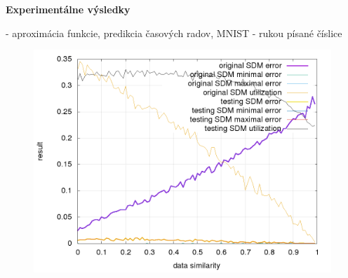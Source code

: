 \documentclass[xcolor=dvipsnames]{beamer}
\begin{document}
\begin{frame}{\bf Experimentálne výsledky}

- aproximácia funkcie, predikcia časových radov, MNIST - rukou písané číslice

\begin{figure}[!htb]
\includegraphics[scale=.35]{../pictures/aproximation_result_all.png}
\label{img:oroginal_sdm}
\end{figure}

\end{frame}
\end{document}
